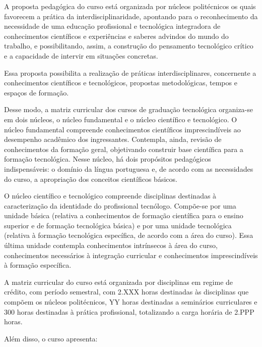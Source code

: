 	A proposta pedagógica do curso está organizada por núcleos politécnicos os quais favorecem a prática da interdisciplinaridade, apontando para o reconhecimento da necessidade de uma educação profissional e tecnológica integradora de conhecimentos científicos e experiências e saberes advindos do mundo do trabalho, e possibilitando, assim, a construção do pensamento tecnológico crítico e a capacidade de intervir em situações concretas.

	Essa proposta possibilita a realização de práticas interdisciplinares, concernente a conhecimentos científicos e tecnológicos, propostas metodológicas, tempos e espaços de formação.

	Desse modo, a matriz curricular dos cursos de graduação tecnológica organiza-se em dois núcleos, o núcleo fundamental e o núcleo científico e tecnológico. O núcleo fundamental compreende conhecimentos científicos imprescindíveis ao desempenho acadêmico dos ingressantes. Contempla, ainda, revisão de conhecimentos da formação geral, objetivando construir base científica para a formação tecnológica. Nesse núcleo, há dois propósitos pedagógicos indispensáveis: o domínio da língua portuguesa e, de acordo com as necessidades do curso, a apropriação dos conceitos científicos básicos.

	O núcleo científico e tecnológico compreende disciplinas destinadas à caracterização da identidade do profissional tecnólogo. Compõe-se por uma unidade básica (relativa a conhecimentos de formação científica para o ensino superior e de formação tecnológica básica) e por uma unidade tecnológica (relativa à formação tecnológica específica, de acordo com a área do curso). Essa última unidade contempla conhecimentos intrínsecos à área do curso, conhecimentos necessários à integração curricular e conhecimentos imprescindíveis à formação específica.

	A matriz curricular do curso está organizada por disciplinas em regime de crédito, com período semestral, com 2.XXX horas destinadas às disciplinas que compõem os núcleos politécnicos, YY horas destinadas a seminários curriculares e 300 horas destinadas à prática profissional, totalizando a carga horária de 2.PPP horas.
	
	Além disso, o curso apresenta:

